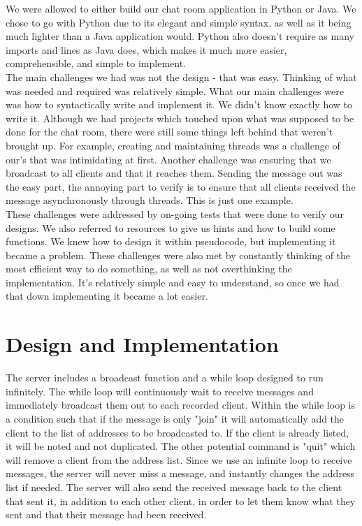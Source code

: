 \documentclass[12pt]{report}
\begin{document}
\noindent
We were allowed to either build our chat room application in Python or Java. We chose to go with Python due to its elegant and simple syntax, as well as it being much lighter than a Java application would. Python also doesn't require as many imports and lines as Java does, which makes it much more easier, comprehensible, and simple to implement. \\

\noindent
The main challenges we had was not the design - that was easy. Thinking of what was needed and required was relatively simple. What our main challenges were was how to syntactically write and implement it. We didn't know exactly how to write it. Although we had projects which touched upon what was supposed to be done for the chat room, there were still some things left behind that weren't brought up. For example, creating and maintaining threads was a challenge of our's that was intimidating at first. Another challenge was ensuring that we broadcast to all clients and that it reaches them. Sending the message out was the easy part, the annoying part to verify is to ensure that all clients received the message asynchronously through threads. This is just one example. \\

\noindent
These challenges were addressed by on-going tests that were done to verify our designs. We also referred to resources to give us hints and how to build some functions. We knew how to design it within pseudocode, but implementing it became a problem. These challenges were also met by constantly thinking of the most efficient way to do something, as well as not overthinking the implementation. It's relatively simple and easy to understand, so once we had that down implementing it became a lot easier.

\section{Design and Implementation}
The server includes a broadcast function and a while loop designed to run infinitely. The while loop will continuously wait to receive messages and immediately broadcast them out to each recorded client. Within the while loop is a condition such that if the message is only "join" it will automatically add the client to the list of addresses to be broadcasted to. If the client is already listed, it will be noted and not duplicated. The other potential command is "{quit}" which will remove a client from the address list. Since we use an infinite loop to receive messages, the server will never miss a message, and instantly changes the address list if needed. The server will also send the received message back to the client that sent it, in addition to each other client, in order to let them know what they sent and that their message had been received. \\
\end{document}
